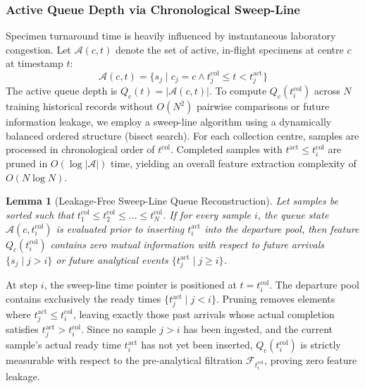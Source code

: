 \documentclass[conference]{IEEEtran}
\newtheorem{lemma}{Lemma}
\begin{document}
\subsubsection{Active Queue Depth via Chronological Sweep-Line}
Specimen turnaround time is heavily influenced by instantaneous laboratory congestion. Let $\mathcal{A}(c, t)$ denote the set of active, in-flight specimens at centre $c$ at timestamp $t$:
\begin{equation}
\mathcal{A}(c, t) = \{ s_j \mid c_j = c \land t_j^{\text{col}} \le t < t_j^{\text{act}} \}
\end{equation}
The active queue depth is $Q_c(t) = |\mathcal{A}(c, t)|$. To compute $Q_c(t_i^{\text{col}})$ across $N$ training historical records without $O(N^2)$ pairwise comparisons or future information leakage, we employ a sweep-line algorithm using a dynamically balanced ordered structure (bisect search). For each collection centre, samples are processed in chronological order of $t^{\text{col}}$. Completed samples with $t^{\text{act}} \le t_i^{\text{col}}$ are pruned in $O(\log |\mathcal{A}|)$ time, yielding an overall feature extraction complexity of $O(N \log N)$.

\begin{lemma}[Leakage-Free Sweep-Line Queue Reconstruction]
Let samples be sorted such that $t_1^{\text{col}} \le t_2^{\text{col}} \le \dots \le t_N^{\text{col}}$. If for every sample $i$, the queue state $\mathcal{A}(c, t_i^{\text{col}})$ is evaluated prior to inserting $t_i^{\text{act}}$ into the departure pool, then feature $Q_c(t_i^{\text{col}})$ contains zero mutual information with respect to future arrivals $\{s_j \mid j > i\}$ or future analytical events $\{t_j^{\text{act}} \mid j \ge i\}$.
\end{lemma}

\begin{IEEEproof}
At step $i$, the sweep-line time pointer is positioned at $t = t_i^{\text{col}}$. The departure pool contains exclusively the ready times $\{t_j^{\text{act}} \mid j < i\}$. Pruning removes elements where $t_j^{\text{act}} \le t_i^{\text{col}}$, leaving exactly those past arrivals whose actual completion satisfies $t_j^{\text{act}} > t_i^{\text{col}}$. Since no sample $j > i$ has been ingested, and the current sample's actual ready time $t_i^{\text{act}}$ has not yet been inserted, $Q_c(t_i^{\text{col}})$ is strictly measurable with respect to the pre-analytical filtration $\mathcal{F}_{t_i^{\text{col}}}$, proving zero feature leakage.
\end{IEEEproof}
\end{document}
